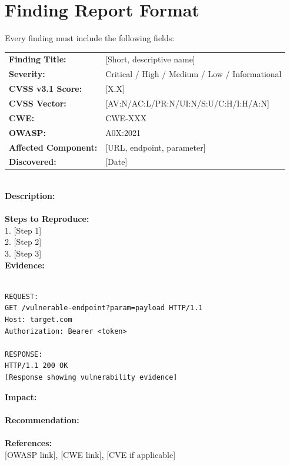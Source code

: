 \section{Finding Report Format}

Every finding must include the following fields:

\begin{tcolorbox}[findingstyle]
\begin{tabular}{ll}
\textbf{Finding Title:} & [Short, descriptive name] \\
\textbf{Severity:} & Critical / High / Medium / Low / Informational \\
\textbf{CVSS v3.1 Score:} & [X.X] \\
\textbf{CVSS Vector:} & [AV:N/AC:L/PR:N/UI:N/S:U/C:H/I:H/A:N] \\
\textbf{CWE:} & CWE-XXX \\
\textbf{OWASP:} & A0X:2021 \\
\textbf{Affected Component:} & [URL, endpoint, parameter] \\
\textbf{Discovered:} & [Date] \\
\end{tabular}\\[8pt]

\textbf{Description:}\\
[2--4 sentences explaining the vulnerability in plain English. Assume the reader is a developer, not a security expert.]\\[6pt]

\textbf{Steps to Reproduce:}\\
1. [Step 1]\\
2. [Step 2]\\
3. [Step 3]\\[6pt]

\textbf{Evidence:}\\
[Include the exact HTTP request and response from Burp Suite]\\
\begin{lstlisting}[style=http]
REQUEST:
GET /vulnerable-endpoint?param=payload HTTP/1.1
Host: target.com
Authorization: Bearer <token>

RESPONSE:
HTTP/1.1 200 OK
[Response showing vulnerability evidence]
\end{lstlisting}

\textbf{Impact:}\\
[Business impact — what can an attacker achieve? Be specific: data exfiltration, account takeover, financial loss.]\\[6pt]

\textbf{Recommendation:}\\
[Actionable, specific remediation steps. Reference secure coding patterns.]\\[6pt]

\textbf{References:}\\
{[}OWASP link{]}, {[}CWE link{]}, {[}CVE if applicable{]}
\end{tcolorbox}

